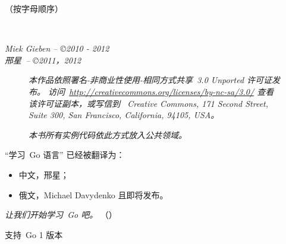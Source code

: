 \documentclass[a4paper,twoside,openleft]{blocksbook}
\begin{document}
\begin{cjkc}
\begin{center}
（{\small 按字母顺序}）


\end{center}
\vfill
\begin{center}
    \hspace*{1cm}\\[2.5ex]
    \hspace*{1cm}{\tiny\CcNote{\CcLongnameByNcSa}}
\end{center}
\begin{center}
\hspace*{1cm}\emph{Miek Gieben -- \copyright 2010 - 2012} \\
\hspace*{1cm}\emph{邢星~-- \copyright 2011，2012}
\end{center}
\vspace{-3em}

\newpage

\thispagestyle{empty}
\begin{figure}[H]
\begin{center}
\emph{
本作品依照署名-非商业性使用-相同方式共享~3.0 Unported 许可证发布。
访问~\url{http://creativecommons.org/licenses/by-nc-sa/3.0/} 
查看该许可证副本，或写信到~
Creative Commons, 171 Second Street, Suite 300, San Francisco, California, 94105, USA。}    
\vspace{2em}

\emph{本书所有实例代码依此方式放入公共领域。}
\end{center}

\end{figure}

\begin{center}
``学习~Go 语言'' 已经被翻译为：
\begin{itemize}
\item 中文，邢星；
\item 俄文，Michael Davydenko 且即将发布\texttrademark。
\end{itemize}
\end{center}

\begin{center}
\vfill
\emph{让我们开始学习~Go 吧。}
（\emph{\version}）

\tiny{支持~Go 1 版本}
\vspace{.2\stockheight}
\end{center}

\clearpage

\tableofcontents*
\listoffigures*
\listofcode* 
\listofex* 
\clearpage


\end{cjkc}
\end{document}
